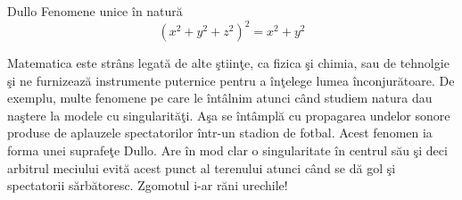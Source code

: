 \begin{surferPage}{Dullo}
Fenomene unice \^in natur\u a\\
\smallskip
\[(x^2+ y^2+ z^2)^2	= x^2+ y^2\]

\singlespacing
Matematica este str\^ans legat\u a de alte \c stiin\c te, ca fizica \c si chimia, sau de tehnolgie \c si ne furnizeaz\u a instrumente puternice pentru a 
\^in\c telege lumea \^inconjur\u atoare.
\singlespacing
De exemplu, multe fenomene pe care le \^int\^alnim atunci c\^and studiem natura dau na\c stere la modele cu singularit\u a\c ti.
\singlespacing
A\c sa se \^int\^ampl\u a  cu propagarea undelor sonore produse de aplauzele spectatorilor \^intr-un stadion de fotbal.
Acest fenomen ia forma unei suprafe\c te Dullo. Are \^in mod clar o singularitate \^in centrul s\u au \c si deci arbitrul meciului evit\u a 
acest punct al terenului atunci c\^and se d\u a gol \c si spectatorii s\u arb\u atoresc. Zgomotul i-ar r\u ani urechile!
\end{surferPage}